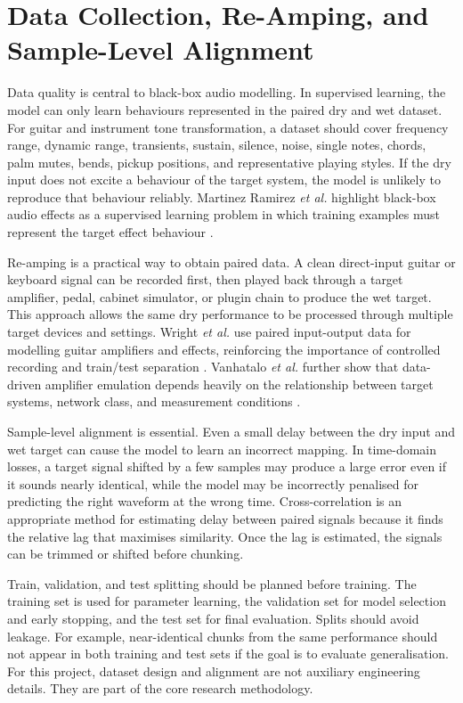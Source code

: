 \documentclass[conference]{IEEEtran}
\begin{document}
\section{Data Collection, Re-Amping, and Sample-Level Alignment}

Data quality is central to black-box audio modelling. In supervised learning, the model can only learn behaviours represented in the paired dry and wet dataset. For guitar and instrument tone transformation, a dataset should cover frequency range, dynamic range, transients, sustain, silence, noise, single notes, chords, palm mutes, bends, pickup positions, and representative playing styles. If the dry input does not excite a behaviour of the target system, the model is unlikely to reproduce that behaviour reliably. Martinez Ramirez \emph{et al.} highlight black-box audio effects as a supervised learning problem in which training examples must represent the target effect behaviour \cite{ramirez2020blackbox}.

Re-amping is a practical way to obtain paired data. A clean direct-input guitar or keyboard signal can be recorded first, then played back through a target amplifier, pedal, cabinet simulator, or plugin chain to produce the wet target. This approach allows the same dry performance to be processed through multiple target devices and settings. Wright \emph{et al.} use paired input-output data for modelling guitar amplifiers and effects, reinforcing the importance of controlled recording and train/test separation \cite{wright2020guitar}. Vanhatalo \emph{et al.} further show that data-driven amplifier emulation depends heavily on the relationship between target systems, network class, and measurement conditions \cite{vanhatalo2022review}.

Sample-level alignment is essential. Even a small delay between the dry input and wet target can cause the model to learn an incorrect mapping. In time-domain losses, a target signal shifted by a few samples may produce a large error even if it sounds nearly identical, while the model may be incorrectly penalised for predicting the right waveform at the wrong time. Cross-correlation is an appropriate method for estimating delay between paired signals because it finds the relative lag that maximises similarity. Once the lag is estimated, the signals can be trimmed or shifted before chunking.

Train, validation, and test splitting should be planned before training. The training set is used for parameter learning, the validation set for model selection and early stopping, and the test set for final evaluation. Splits should avoid leakage. For example, near-identical chunks from the same performance should not appear in both training and test sets if the goal is to evaluate generalisation. For this project, dataset design and alignment are not auxiliary engineering details. They are part of the core research methodology.
\end{document}
